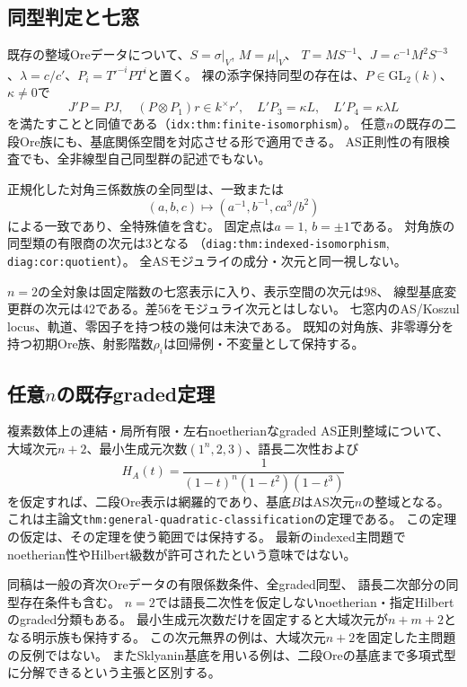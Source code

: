 \documentclass[11pt,a4paper]{ltjsarticle}
\begin{document}
\subsection{同型判定と七窓}
既存の整域Oreデータについて、$S=\sigma|_V$, $M=\mu|_V$、
$T=MS^{-1}$、$J=c^{-1}M^2S^{-3}$、$\lambda=c/c'$、$P_i=T'^{-i}PT^i$と置く。
裸の添字保持同型の存在は、$P\in\mathrm{GL}_2(k)$、$\kappa\ne0$で
\[
J'P=PJ,\quad(P\otimes P_1)r\in k^\times r',\quad
L'P_3=\kappa L,\quad L'P_4=\kappa\lambda L
\]
を満たすことと同値である（\texttt{idx:thm:finite-isomorphism}）。
任意$n$の既存の二段Ore族にも、基底関係空間を対応させる形で適用できる。
AS正則性の有限検査でも、全非線型自己同型群の記述でもない。

正規化した対角三係数族の全同型は、一致または
\[
(a,b,c)\longmapsto(a^{-1},b^{-1},ca^3/b^2)
\]
による一致であり、全特殊値を含む。
固定点は$a=1$, $b=\pm1$である。
対角族の同型類の有限商の次元は3となる
（\texttt{diag:thm:indexed-isomorphism}, \texttt{diag:cor:quotient}）。
全ASモジュライの成分・次元と同一視しない。

$n=2$の全対象は固定階数の七窓表示に入り、表示空間の次元は98、
線型基底変更群の次元は42である。差56をモジュライ次元とはしない。
七窓内のAS/Koszul locus、軌道、零因子を持つ枝の幾何は未決である。
既知の対角族、非零導分を持つ初期Ore族、射影階数$\rho_i$は回帰例・不変量として保持する。

\subsection{任意\texorpdfstring{$n$}{n}の既存graded定理}
複素数体上の連結・局所有限・左右noetherianなgraded AS正則整域について、
大域次元$n+2$、最小生成元次数$(1^n,2,3)$、語長二次性および
\[
H_A(t)=\frac{1}{(1-t)^n(1-t^2)(1-t^3)}
\]
を仮定すれば、二段Ore表示は網羅的であり、基底$B$はAS次元$n$の整域となる。
これは主論文\texttt{thm:general-quadratic-classification}の定理である。
この定理の仮定は、その定理を使う範囲では保持する。
最新のindexed主問題でnoetherian性やHilbert級数が許可されたという意味ではない。

同稿は一般の斉次Oreデータの有限係数条件、全graded同型、
語長二次部分の同型存在条件も含む。
$n=2$では語長二次性を仮定しないnoetherian・指定Hilbertのgraded分類もある。
最小生成元次数だけを固定すると大域次元が$n+m+2$となる明示族も保持する。
この次元無界の例は、大域次元$n+2$を固定した主問題の反例ではない。
またSklyanin基底を用いる例は、二段Oreの基底まで多項式型に分解できるという主張と区別する。
\end{document}
